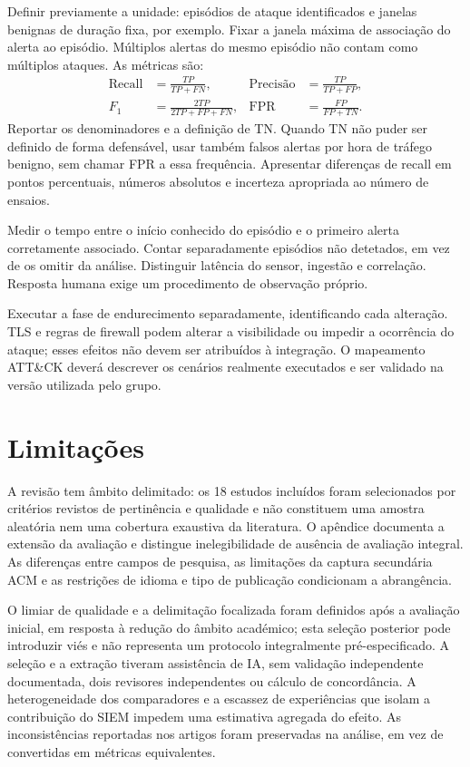 \documentclass[11pt,a4paper]{article}
\begin{document}
Definir previamente a unidade: episódios de ataque identificados e janelas benignas de duração fixa, por exemplo. Fixar a janela máxima de associação do alerta ao episódio. Múltiplos alertas do mesmo episódio não contam como múltiplos ataques. As métricas são:
\begin{align*}
\mathrm{Recall}&=\frac{TP}{TP+FN}, &\mathrm{Precisão}&=\frac{TP}{TP+FP},\\
F_1&=\frac{2TP}{2TP+FP+FN}, &\mathrm{FPR}&=\frac{FP}{FP+TN}.
\end{align*}
Reportar os denominadores e a definição de TN. Quando TN não puder ser definido de forma defensável, usar também falsos alertas por hora de tráfego benigno, sem chamar FPR a essa frequência. Apresentar diferenças de recall em pontos percentuais, números absolutos e incerteza apropriada ao número de ensaios.

Medir o tempo entre o início conhecido do episódio e o primeiro alerta corretamente associado. Contar separadamente episódios não detetados, em vez de os omitir da análise. Distinguir latência do sensor, ingestão e correlação. Resposta humana exige um procedimento de observação próprio.

Executar a fase de endurecimento separadamente, identificando cada alteração. TLS e regras de firewall podem alterar a visibilidade ou impedir a ocorrência do ataque; esses efeitos não devem ser atribuídos à integração. O mapeamento ATT\&CK deverá descrever os cenários realmente executados e ser validado na versão utilizada pelo grupo.

\section{Limitações}
A revisão tem âmbito delimitado: os 18 estudos incluídos foram selecionados por critérios revistos de pertinência e qualidade e não constituem uma amostra aleatória nem uma cobertura exaustiva da literatura. O apêndice documenta a extensão da avaliação e distingue inelegibilidade de ausência de avaliação integral. As diferenças entre campos de pesquisa, as limitações da captura secundária ACM e as restrições de idioma e tipo de publicação condicionam a abrangência.

O limiar de qualidade e a delimitação focalizada foram definidos após a avaliação inicial, em resposta à redução do âmbito académico; esta seleção posterior pode introduzir viés e não representa um protocolo integralmente pré-especificado. A seleção e a extração tiveram assistência de IA, sem validação independente documentada, dois revisores independentes ou cálculo de concordância. A heterogeneidade dos comparadores e a escassez de experiências que isolam a contribuição do SIEM impedem uma estimativa agregada do efeito. As inconsistências reportadas nos artigos foram preservadas na análise, em vez de convertidas em métricas equivalentes.
\end{document}
